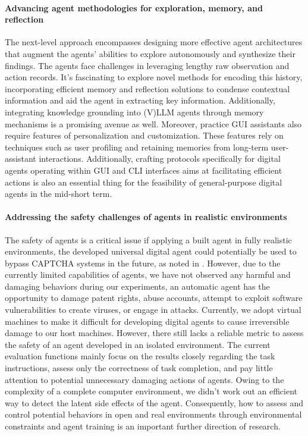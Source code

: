 \paragraph{Advancing agent methodologies for exploration, memory, and reflection}
The next-level approach encompasses designing more effective agent architectures that
augment the agents' abilities to explore autonomously and synthesize their findings. 
The agents face challenges in leveraging lengthy raw observation and action records. It's fascinating to explore novel methods for encoding this history, incorporating efficient memory and reflection solutions to condense contextual information and aid the agent in extracting key information. Additionally, integrating knowledge grounding into (V)LLM agents through memory mechanisms is a promising avenue as well.
Moreover, practice GUI assistants also require features of personalization and customization. These features rely on techniques such as user profiling and retaining memories from long-term user-assistant interactions.
Additionally, crafting protocols specifically for digital agents operating within GUI and CLI interfaces aims at facilitating efficient actions is also an essential thing for the feasibility of general-purpose digital agents in the mid-short term.

\paragraph{Addressing the safety challenges of agents in realistic environments}
The safety of agents is a critical issue if applying a built agent in fully realistic environments, the developed universal digital agent could potentially be used to bypass CAPTCHA systems in the future, as noted in \citep{searles2023empirical}. 
However, due to the currently limited capabilities of agents, we have not observed any harmful and damaging behaviors during our experiments, an automatic agent has the opportunity to damage patent rights, abuse accounts, attempt to exploit software vulnerabilities to create viruses, or engage in attacks. 
Currently, we adopt virtual machines to make it difficult for developing digital agents to cause irreversible damage to our host machines. 
However, there still lacks a reliable metric to assess the safety of an agent developed in an isolated environment. 
The current evaluation functions mainly focus on the results closely regarding the task instructions, assess only the correctness of task completion, and pay little attention to potential unnecessary damaging actions of agents.
Owing to the complexity of a complete computer environment, we didn't work out an efficient way to detect the latent side effects of the agent.
Consequently, how to assess and control potential behaviors in open and real environments through environmental constraints and agent training is an important further direction of research.

